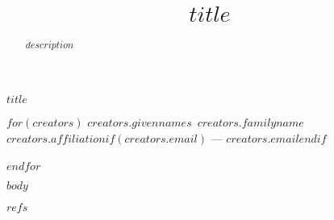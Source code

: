 \documentclass[11pt]{article}
\title{$title$}
\author{}
\date{}
\begin{document}
{\LARGE $title$}

\medskip

$for(creators)$
{\small $creators.givennames$~\textsc{$creators.familyname$}}\\
{\small \emph{$creators.affiliation$}$if(creators.email)$ --- \texttt{$creators.email$}$endif$}\\
\\
$endfor$



\begin{abstract}
$description$
\end{abstract}

\setpagewiselinenumbers
\modulolinenumbers[2]
\linenumbers
\doublespace

$body$

$refs$
\end{document}
